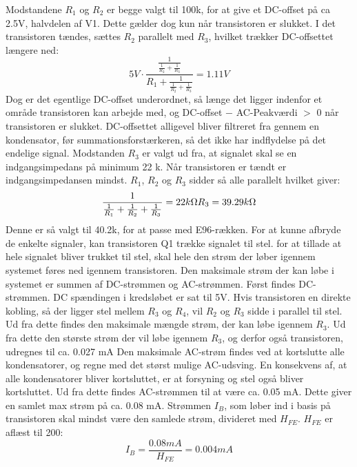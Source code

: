 Modstandene $R_1$ og $R_2$ er begge valgt til 100k\ohm, for at give et DC-offset på ca 2.5V, halvdelen af V1. Dette gælder dog kun når transistoren er slukket. I det transistoren tændes, sættes $R_2$ parallelt med $R_3$, hvilket trækker DC-offsettet længere ned:
\begin{equation}
5V\cdot \frac{\frac{1}{\frac{1}{R_2}+\frac{1}{R_3}}}{R_1+\frac{1}{\frac{1}{R_2}+\frac{1}{R_3}}}=1.11 V
\end{equation}
Dog er det egentlige DC-offset underordnet, så længe det ligger indenfor et område transistoren kan arbejde med, og DC-offset $-$ AC-Peakværdi $>$ 0 når transistoren er slukket. DC-offsettet alligevel bliver filtreret fra gennem en kondensator, før summationsforstærkeren, så det ikke har indflydelse på det endelige signal.
Modstanden $R_3$ er valgt ud fra, at signalet skal se en indgangsimpedans på minimum 22 k\ohm. Når transistoren er tændt er indgangsimpedansen mindst. $R_1$, $R_2$ og $R_3$ sidder så alle parallelt hvilket giver:
\begin{equation}
\frac{1}{\frac{1}{R_1}+\frac{1}{R_2}+\frac{1}{R_3}}=22 k\ohm
\\
R_3=39.29 k\ohm
\end{equation}
Denne er så valgt til 40.2k\ohm, for at passe med E96-rækken.
For at kunne afbryde de enkelte signaler, kan transistoren Q1 trække signalet til stel. for at tillade at hele signalet bliver trukket til stel, skal hele den strøm der løber igennem systemet føres ned igennem transistoren. Den maksimale strøm der kan løbe i systemet er summen af DC-strømmen og AC-strømmen. 
Først findes DC-strømmen. DC spændingen i kredsløbet er sat til 5V. Hvis transistoren en direkte kobling, så der ligger stel mellem $R_3$ og $R_4$, vil $R_2$ og $R_3$ sidde i parallel til stel. Ud fra dette findes den maksimale mængde strøm, der kan løbe igennem $R_3$. Ud fra dette den største strøm der vil løbe igennem $R_3$, og derfor også transistoren, udregnes til ca. 0.027 mA
Den maksimale AC-strøm findes ved at kortslutte alle kondensatorer, og regne med det størst mulige AC-udsving. En konsekvens af, at alle kondensatorer bliver kortsluttet, er at forsyning og stel også bliver kortsluttet. Ud fra dette findes AC-strømmen til at være ca. 0.05 mA. Dette giver en samlet max strøm på ca. 0.08 mA.
Strømmen $I_B$, som løber ind i basis på transistoren skal mindst være den samlede strøm, divideret med $H_{FE}$. $H_{FE}$ er aflæst til 200:
\begin{equation}
I_B = \frac{0.08 mA}{H_{FE}} = 0.004 mA
\end{equation}
